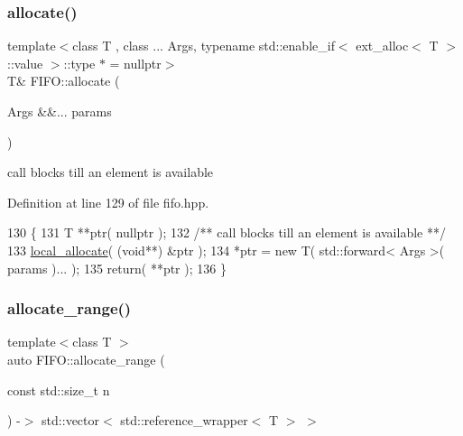 \subsubsection{\texorpdfstring{allocate()}{allocate()}\hspace{0.1cm}{\footnotesize\ttfamily [3/3]}}
{\footnotesize\ttfamily template$<$class T , class ... Args, typename std\+::enable\+\_\+if$<$ ext\+\_\+alloc$<$ T $>$\+::value $>$\+::type $\ast$  = nullptr$>$ \\
T\& F\+I\+F\+O\+::allocate (\begin{DoxyParamCaption}\item[{Args \&\&...}]{params }\end{DoxyParamCaption})\hspace{0.3cm}{\ttfamily [inline]}}

call blocks till an element is available 

Definition at line 129 of file fifo.\+hpp.


\begin{DoxyCode}
130    \{
131       T **ptr( \textcolor{keyword}{nullptr} );\textcolor{comment}{}
132 \textcolor{comment}{      /** call blocks till an element is available **/}
133       \hyperlink{class_f_i_f_o_a60068cb00b13626e41d4b11099354ae3}{local\_allocate}( (\textcolor{keywordtype}{void}**) &ptr );
134       *ptr = \textcolor{keyword}{new} T( std::forward< Args >( params )... );
135       \textcolor{keywordflow}{return}( **ptr );
136    \}
\end{DoxyCode}
\hypertarget{class_f_i_f_o_a8b93da58a3fd6ecd844827c4fcbd2473}{}\label{class_f_i_f_o_a8b93da58a3fd6ecd844827c4fcbd2473} 
\subsubsection{\texorpdfstring{allocate\+\_\+range()}{allocate\_range()}}
{\footnotesize\ttfamily template$<$class T $>$ \\
auto F\+I\+F\+O\+::allocate\+\_\+range (\begin{DoxyParamCaption}\item[{const std\+::size\+\_\+t}]{n }\end{DoxyParamCaption}) -\/$>$ std\+::vector$<$ std\+::reference\+\_\+wrapper$<$ T $>$ $>$
   \hspace{0.3cm}{\ttfamily [inline]}}

